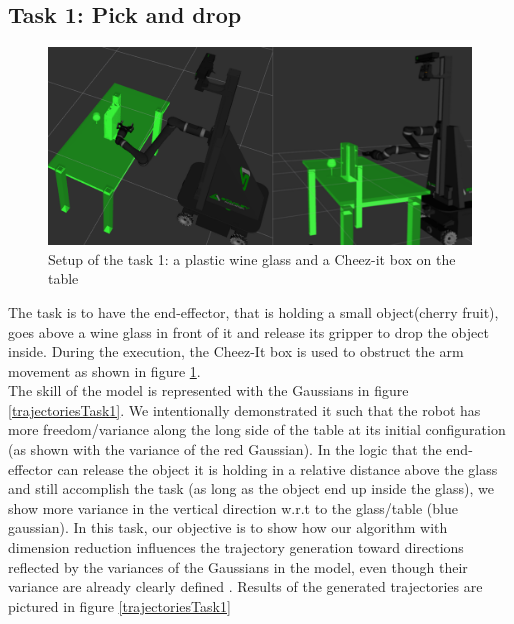 \documentclass[letterpaper, 10 pt, conference]{ieeeconf}  %
\begin{document}
\subsection{Task 1: Pick and drop}
\begin{figure}[h]
	\centering
	\includegraphics[scale=0.22]{figure/task1Scenario.png}
	\caption{Setup of the task 1: a plastic wine glass and a Cheez-it box on the table}
	\label{task1Scenario}
\end{figure}
The task is to have the end-effector, that is holding a small object(cherry fruit), goes above a wine glass in front of it and release its gripper to drop the object inside. During the execution, the Cheez-It box is used to obstruct the arm movement as shown in figure \ref{task1Scenario}. \\
The skill of the model is represented with the Gaussians in figure \ref{trajectoriesTask1}. We intentionally demonstrated it such that the robot has more freedom/variance along the long side of the table at its initial configuration (as shown with the variance of the red Gaussian). In the logic that the end-effector can release the object it is holding  in a relative distance above the glass and still accomplish the task (as long as the object end up inside the glass), we show more variance in the vertical direction w.r.t to the glass/table (blue gaussian).
In this task, our objective is to show how our algorithm with dimension reduction influences the trajectory generation toward directions reflected by the variances of the Gaussians in the model, even though their variance are already clearly defined . Results of the generated trajectories are pictured in figure \ref{trajectoriesTask1} \\
\end{document}
